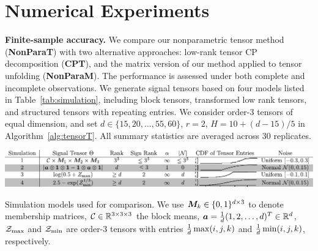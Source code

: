 \documentclass{article}
\theoremstyle{plain}
\theoremstyle{definition}
\begin{document}


\vspace{-.3cm}
\section{Numerical Experiments}\label{sec:simulation}
\vspace{-.2cm}

{\bf Finite-sample accuracy.} We compare our nonparametric tensor method ({\bf NonParaT}) with two alternative approaches: low-rank tensor CP decomposition ({\bf CPT}), and the matrix version of our method applied to tensor unfolding ({\bf NonParaM}). The performance is assessed under both complete and incomplete observations.  We generate signal tensors based on four models listed in Table~\ref{tab:simulation}, including block tensors, transformed low rank tensors, and structured tensors with repeating entries. We consider order-3  tensors of equal dimension, and set $d\in \{15, 20,\ldots,55,60\}$, $r=2$, $H=10+{(d-15)/ 5}$ in Algorithm~\ref{alg:tensorT}. All summary statistics are averaged across $30$ replicates. 


\begin{table}[h]
\captionsetup{font=scriptsize}
\includegraphics[width=\textwidth]{figure/simulation2.pdf}
\vspace{-.2cm}
\caption{\scriptsize Simulation models used for comparison. We use $\bm M_k\in\{0,1\}^{d\times 3}$ to denote membership matrices, $\mathcal{C}\in\mathbb{R}^{3\times 3\times 3}$ the block means, $\bm{a}={1\over d}(1,2,\ldots,d)^T \in\mathbb{R}^d$, $\mathcal{Z}_{\max}$ and $\mathcal{Z}_{\min}$ are order-3 tensors with entries ${1\over d}\max(i,j,k)$ and ${1\over d}\min(i,j,k)$, respectively.}\label{tab:simulation}
\vspace{-.3cm}
\end{table}
\end{document}
